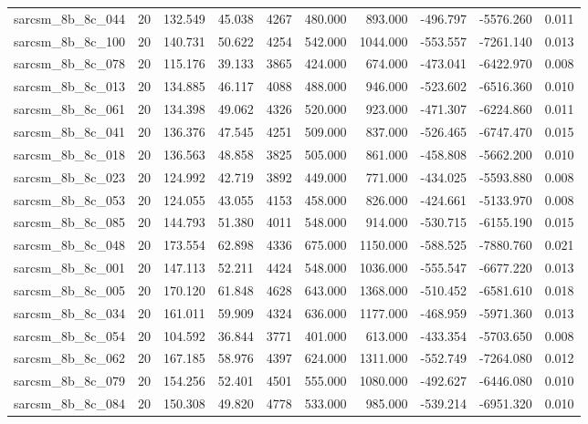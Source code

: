 \begin{tabular}{lrrrrrrrrr}
sarcsm\_8b\_8c\_044 & 20 & 132.549 & 45.038 & 4267 & 480.000 & 893.000 & -496.797 & -5576.260 & 0.011 \\
sarcsm\_8b\_8c\_100 & 20 & 140.731 & 50.622 & 4254 & 542.000 & 1044.000 & -553.557 & -7261.140 & 0.013 \\
sarcsm\_8b\_8c\_078 & 20 & 115.176 & 39.133 & 3865 & 424.000 & 674.000 & -473.041 & -6422.970 & 0.008 \\
sarcsm\_8b\_8c\_013 & 20 & 134.885 & 46.117 & 4088 & 488.000 & 946.000 & -523.602 & -6516.360 & 0.010 \\
sarcsm\_8b\_8c\_061 & 20 & 134.398 & 49.062 & 4326 & 520.000 & 923.000 & -471.307 & -6224.860 & 0.011 \\
sarcsm\_8b\_8c\_041 & 20 & 136.376 & 47.545 & 4251 & 509.000 & 837.000 & -526.465 & -6747.470 & 0.015 \\
sarcsm\_8b\_8c\_018 & 20 & 136.563 & 48.858 & 3825 & 505.000 & 861.000 & -458.808 & -5662.200 & 0.010 \\
sarcsm\_8b\_8c\_023 & 20 & 124.992 & 42.719 & 3892 & 449.000 & 771.000 & -434.025 & -5593.880 & 0.008 \\
sarcsm\_8b\_8c\_053 & 20 & 124.055 & 43.055 & 4153 & 458.000 & 826.000 & -424.661 & -5133.970 & 0.008 \\
sarcsm\_8b\_8c\_085 & 20 & 144.793 & 51.380 & 4011 & 548.000 & 914.000 & -530.715 & -6155.190 & 0.015 \\
sarcsm\_8b\_8c\_048 & 20 & 173.554 & 62.898 & 4336 & 675.000 & 1150.000 & -588.525 & -7880.760 & 0.021 \\
sarcsm\_8b\_8c\_001 & 20 & 147.113 & 52.211 & 4424 & 548.000 & 1036.000 & -555.547 & -6677.220 & 0.013 \\
sarcsm\_8b\_8c\_005 & 20 & 170.120 & 61.848 & 4628 & 643.000 & 1368.000 & -510.452 & -6581.610 & 0.018 \\
sarcsm\_8b\_8c\_034 & 20 & 161.011 & 59.909 & 4324 & 636.000 & 1177.000 & -468.959 & -5971.360 & 0.013 \\
sarcsm\_8b\_8c\_054 & 20 & 104.592 & 36.844 & 3771 & 401.000 & 613.000 & -433.354 & -5703.650 & 0.008 \\
sarcsm\_8b\_8c\_062 & 20 & 167.185 & 58.976 & 4397 & 624.000 & 1311.000 & -552.749 & -7264.080 & 0.012 \\
sarcsm\_8b\_8c\_079 & 20 & 154.256 & 52.401 & 4501 & 555.000 & 1080.000 & -492.627 & -6446.080 & 0.010 \\
sarcsm\_8b\_8c\_084 & 20 & 150.308 & 49.820 & 4778 & 533.000 & 985.000 & -539.214 & -6951.320 & 0.010 \\

\end{tabular}
